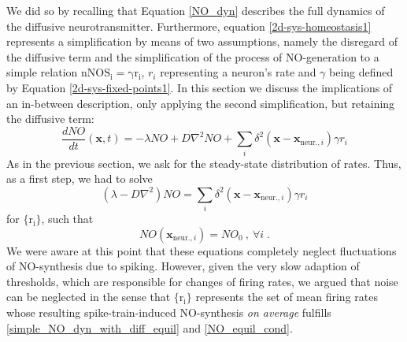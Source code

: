 \documentclass[10pt,a4paper]{article}
\begin{document}
We did so by recalling that Equation \eqref{NO_dyn} describes the full dynamics of the diffusive neurotransmitter. Furthermore, equation \eqref{2d-sys-homeostasis1} represents a simplification by means of two assumptions, namely the disregard of the diffusive term and the simplification of the process of NO-generation to a simple relation $\mathrm{nNOS_i = \gamma  r_i}$, $r_i$ representing a neuron's rate and $\gamma$ being defined by Equation \eqref{2d-sys-fixed-points1}. In this section we discuss the implications of an in-between description, only applying the second simplification, but retaining the diffusive term:
\begin{equation}
\frac{dNO}{dt}(\mathbf{x},t) =-\lambda NO + D \nabla^2 NO + \sum_{i} \delta^2 \left( \mathbf{x}-\mathbf{x}_{\mathrm{ neur.},i} \right) \gamma r_i
\label{simple_NO_dyn_with_diff}
\end{equation}
As in the previous section, we ask for the steady-state distribution of rates. Thus, as a first step, we had to solve
\begin{equation}
\left( \lambda - D \nabla^2 \right) NO = \sum_{i} \delta^2 \left( \mathbf{x}-\mathbf{x}_{\mathrm{ neur.},i} \right) \gamma  r_i
\label{simple_NO_dyn_with_diff_equil}
\end{equation}
for $\mathrm{\lbrace r_i\rbrace}$, such that
\begin{equation}
NO(\mathbf{x}_{\mathrm{ neur.},i}) = NO_0 \:, \: \forall i \; .
\label{NO_equil_cond}
\end{equation}
We were aware at this point that these equations completely neglect fluctuations of NO-synthesis due to spiking. However, given the very slow adaption of thresholds, which are responsible for changes of firing rates, we argued that noise can be neglected in the sense that $\mathrm{\lbrace r_i\rbrace}$ represents the set of mean firing rates whose resulting spike-train-induced NO-synthesis \emph{on average} fulfills \eqref{simple_NO_dyn_with_diff_equil} and \eqref{NO_equil_cond}.
  
\end{document}
